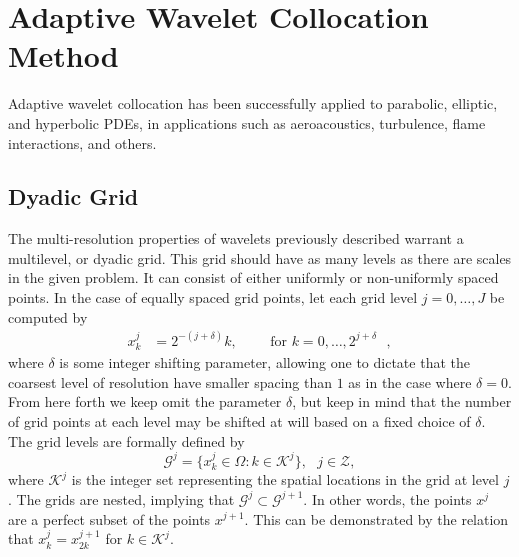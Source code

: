 \documentclass[11pt]{article}
\begin{document}
\section{Adaptive Wavelet Collocation Method}
Adaptive wavelet collocation has been successfully applied to parabolic, elliptic, and 
hyperbolic PDEs, in applications such as aeroacoustics, turbulence, flame interactions, and others. 

\subsection{Dyadic Grid}
The multi-resolution properties of wavelets previously described warrant a multilevel, or dyadic grid.
This grid should have as many levels as there are scales in the given problem. It can consist of 
either uniformly or non-uniformly spaced points. In the case of equally spaced grid points, 
let each grid level $j = 0, \dots, J$ be computed by 
\begin{align}
x^{j}_{k} &= 2^{-(j+\delta)} k,\text{ } \text{ } \text{ }  \text{ for $k=0,\dots,2^{j+\delta}$ },
\end{align}
where $\delta$ is some integer shifting parameter, allowing one to dictate that the coarsest level of resolution have 
smaller spacing than $1$ as in the case where $\delta=0$. From here forth we keep omit the parameter $\delta$, but keep
in mind that the number of grid points at each level may be shifted at will based on a fixed choice of $\delta$. 
The grid levels are formally defined by 
\begin{equation}
    \mathcal{G}^j= \{ x_{k}^{j} \in \Omega : k \in \mathcal{K}^j \}, \text{ } j \in \mathcal{Z},
\end{equation}
where $\mathcal{K}^{j}$ is the integer set representing the spatial locations in the grid at level $j$. The grids are 
nested, implying that $\mathcal{G}^{j} \subset \mathcal{G}^{j+1}$. In other words, the points $x^{j}$ are a perfect 
subset of the points $x^{j+1}$. This can be demonstrated by the relation that 
$x_{k}^{j}=x_{2k}^{j+1}$ for $k \in \mathcal{K}^{j}$.
\end{document}
